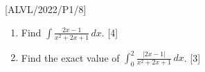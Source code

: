 \item {[}ALVL/2022/P1/8{]}
\begin{enumerate}
\item Find $\int\frac{2x-1}{x^{2}+2x+1}\,dx$. \hfill{}{[}4{]}
\item Find the exact value of $\int_{0}^{2}\frac{\left|2x-1\right|}{x^{2}+2x+1}\,dx$.
\hfill{}{[}3{]}
\end{enumerate}

